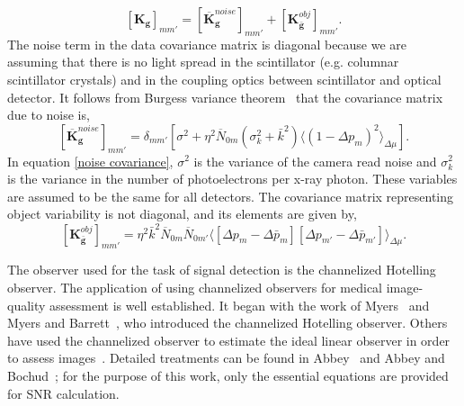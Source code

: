 %
\begin{equation}
\label{gen covariance2}
[\mathbf{K_g}]_{mm'} = [\overline{\mathbf{K}}_\mathbf{g}^{noise}]_{mm'}+[\mathbf{K}_{\mathbf{\bar{g}}}^{obj}]_{mm'}.
\end{equation}
%
The noise term in the data covariance matrix is diagonal because we are assuming that there is no light spread in the scintillator (e.g. columnar scintillator crystals) and in the coupling optics between scintillator and optical detector.  It follows from Burgess variance theorem~\citep{Burgess1959, Barrett2004} that the covariance matrix due to noise is,
%
\begin{equation}
\label{noise covariance}
[\overline{\mathbf{K}}_\mathbf{g}^{noise}]_{mm'}= \delta_{mm'}[\sigma^2 + \eta^2 \overline{N}_{0m} (\sigma_k^2 + \bar{k}^2)\langle(1-\Delta p_m)^2 \rangle_{\Delta\mu}].
\end{equation}
%
In equation \ref{noise covariance}, $\sigma^2$ is the variance of the camera read noise and $\sigma_k^2$ is the variance in the number of photoelectrons per x-ray photon.  These variables are assumed to be the same for all detectors.
The covariance matrix representing object variability is not diagonal, and its elements are given by,
%
\begin{equation}
\label{object covariance}
[\mathbf{K}_{\mathbf{\bar{g}}}^{obj}]_{mm'}=\eta^2\bar{k}^2\overline{N}_{0m}\overline{N}_{0m'} \langle[\Delta p_m - \Delta \bar{p}_m][\Delta p_{m'}-\Delta \bar{p}_{m'}]\rangle _{\Delta \mu}.
\end{equation}
%

The observer used for the task of signal detection is the channelized Hotelling observer.  The application of using channelized observers for medical image-quality assessment is well established.  It began with the work of Myers~\citep{MyersThesis} and Myers and Barrett~\citep{Myers1987}, who introduced the channelized Hotelling observer.  Others have used the channelized observer to estimate the ideal linear observer in order to assess images~\citep{Gallas2003,Abbey2000, Abbey2001}.  Detailed treatments can be found in Abbey~\citep{AbbeyThesis} and Abbey and Bochud~\citep{Abbey2000}; for the purpose of this work, only the essential equations are provided for SNR calculation.

